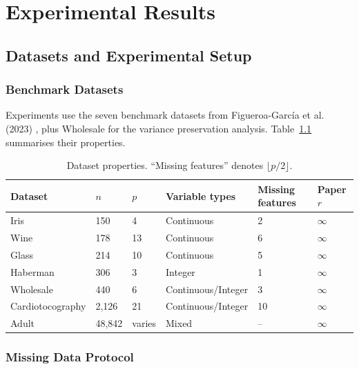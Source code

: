 
\chapter{Experimental Results}
\label{Chapter4}


\section{Datasets and Experimental Setup}

\subsection{Benchmark Datasets}

Experiments use the seven benchmark datasets from Figueroa-Garc\'ia et al. (2023) \cite{FigueroaGarcia2023}, plus Wholesale for the variance preservation analysis. Table~\ref{tab:datasets} summarises their properties.

\begin{table}[h]
\caption{Dataset properties. ``Missing features'' denotes $\lfloor p/2 \rfloor$.}
\label{tab:datasets}
\centering
\begin{tabular}{llllll}
\toprule
\textbf{Dataset} & $n$ & $p$ & \textbf{Variable types} & \textbf{Missing features} & \textbf{Paper} $r$ \\
\midrule
Iris          & 150    & 4  & Continuous       & 2  & $\infty$ \\
Wine          & 178    & 13 & Continuous       & 6  & $\infty$ \\
Glass         & 214    & 10 & Continuous       & 5  & $\infty$ \\
Haberman      & 306    & 3  & Integer          & 1  & $\infty$ \\
Wholesale     & 440    & 6  & Continuous/Integer & 3 & $\infty$ \\
Cardiotocography & 2,126 & 21 & Continuous/Integer & 10 & $\infty$ \\
Adult         & 48,842 & varies & Mixed        & -- & $\infty$ \\
\bottomrule
\end{tabular}
\end{table}

\subsection{Missing Data Protocol}

